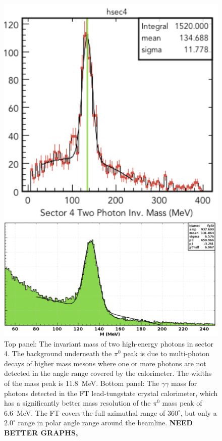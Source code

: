 \documentclass[final,3p,twocolumn]{elsarticle}
\begin{document}
\begin{figure}[htbp!]
\centerline{\includegraphics[width=0.95\columnwidth]{pi0.png}}
\centerline{\includegraphics[width=0.9\columnwidth]{ft-pi0.png}}
\caption{Top panel: The invariant mass of two high-energy photons in sector 4. The background underneath the 
$\pi^0$ peak is due to multi-photon decays of higher mass mesons where one or more photons 
are not detected in the angle range covered by the calorimeter. The widths of the mass peak is 11.8~MeV. 
Bottom panel: The $\gamma\gamma$ mass for photons detected in the FT lead-tungstate crystal calorimeter, which 
has a significantly better mass resolution of the $\pi^0$ mass peak of 6.6~MeV. The FT covers the full azimuthal range of $360^\circ$, 
but only a $2.0^\circ$ range in polar angle range around the beamline.  
{\bf NEED BETTER GRAPHS, }} 
\label{gg}
\end{figure} 
\end{document}
